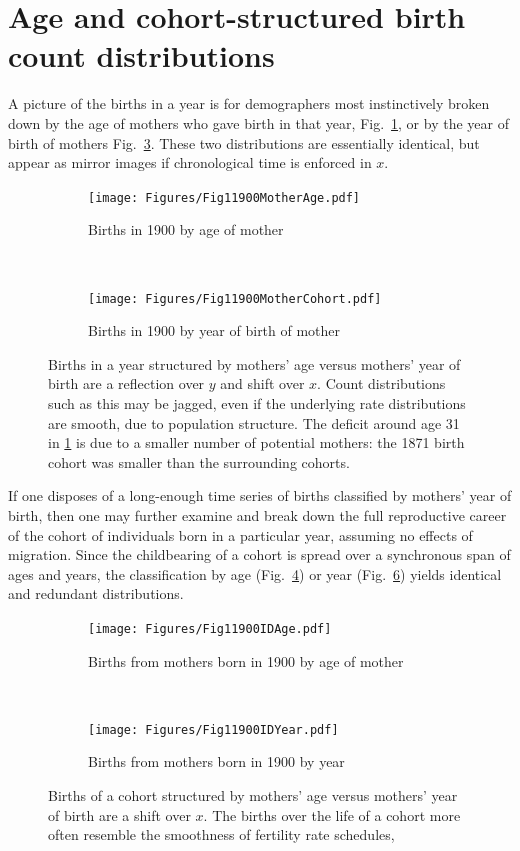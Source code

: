 \documentclass{article}
\begin{document}
\section{Age and cohort-structured birth count distributions}
A picture of the births in a year is for demographers most instinctively broken down by the age of mothers who gave birth in that year, Fig.~\ref{fig:agemother}, or by the year of birth of mothers Fig.~\ref{fig:cohmother}. These two distributions are essentially identical, but appear as mirror images if chronological time is enforced in $x$.

\begin{figure}[ht!]
\begin{subfigure}[t]{0.5\textwidth}
        \centering
        \texttt{[image: Figures/Fig11900MotherAge.pdf]}
        \caption{Births in 1900 by age of mother}
        \label{fig:agemother}
\end{subfigure}
~
\begin{subfigure}[t]{0.5\textwidth}
        \centering
        \texttt{[image: Figures/Fig11900MotherCohort.pdf]}
        \caption{Births in 1900 by year of birth of mother}
          \label{fig:cohmother}
\end{subfigure}
\caption{Births in a year structured by mothers' age versus mothers' year of birth are a
reflection over $y$ and shift over $x$. Count distributions such as this may be jagged, even if the underlying rate distributions are smooth, due to population structure. The deficit around age 31 in \ref{fig:agemother} is due to a smaller number of potential mothers: the 1871 birth cohort was smaller than the surrounding cohorts.}
\end{figure}

If one disposes of a long-enough time series of births classified by mothers' year of birth, then one may further examine and break down the full reproductive career of the cohort of individuals born in a particular year, assuming no effects of migration. Since the childbearing of a cohort is spread over a synchronous span of ages and years, the classification by age (Fig.~\ref{fig:age1900mother}) or year (Fig.~\ref{fig:year1900}) yields identical and redundant distributions.

\begin{figure}[ht!]
\begin{subfigure}[t]{0.5\textwidth}
        \centering
        \texttt{[image: Figures/Fig11900IDAge.pdf]}
        \caption{Births from mothers born in 1900 by age of mother}
        \label{fig:age1900mother}
\end{subfigure}
~
\begin{subfigure}[t]{0.5\textwidth}
        \centering
        \texttt{[image: Figures/Fig11900IDYear.pdf]}
        \caption{Births from mothers born in 1900 by year}
          \label{fig:year1900}
\end{subfigure}
\caption{Births of a cohort structured by mothers' age versus mothers' year of birth are a
shift over $x$. The births over the life of a cohort more often resemble the smoothness of fertility rate schedules,}
\end{figure}
\end{document}
